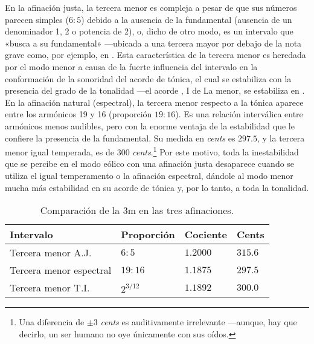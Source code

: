 \documentclass[a4paper,12pt]{article}
\begin{document}
\begin{multicols}{2}
  En la afinación justa, la tercera menor es compleja a pesar de que sus números parecen simples ($6:5$) debido a la ausencia de la fundamental (ausencia de un denominador 1, 2 o potencia de 2), o, dicho de otro modo, es un intervalo que «busca a su fundamental» ---ubicada a una tercera mayor por debajo de la nota grave como, por ejemplo,  en \hbox{.} Esta característica de la tercera menor es heredada por el modo menor a causa de la fuerte influencia del intervalo en la conformación de la sonoridad del acorde de tónica, el cual se estabiliza con la presencia del  grado de la tonalidad ---el acorde , I de La menor, se estabiliza en \hbox{.} En la afinación natural (espectral), la tercera menor respecto a la tónica aparece entre los armónicos 19 y 16 (proporción $19:16$). Es una relación interválica entre armónicos menos audibles, pero con la enorme ventaja de la estabilidad que le confiere la presencia de la fundamental. Su medida en \emph{cents} es $297.5$, y la tercera menor igual temperada, es de $300$ \emph{cents}.\footnote{Una diferencia de $\pm3$ \emph{cents} es auditivamente irrelevante ---aunque, hay que decirlo, un ser humano no oye únicamente con sus oídos.} Por este motivo, toda la inestabilidad que se percibe en el modo eólico con una afinación justa desaparece cuando se utiliza el igual temperamento o la afinación espectral, dándole al modo menor mucha más estabilidad en su acorde de tónica y, por lo tanto, a toda la tonalidad.
\end{multicols}

\begin{table}[ht]
  \centering
  \caption{Comparación de la 3m en las tres afinaciones.}\label{tab:3m}
  \begin{tabular}{@{}llll@{}}
  \toprule
  Intervalo               & Proporción  & Cociente & Cents   \\ \midrule
  Tercera menor A.J.      & $6:5$       & $1.2000$ & $315.6$ \\
  Tercera menor espectral & $19:16$     & $1.1875$ & $297.5$ \\
  Tercera menor T.I.      & $2^{3/12}$  & $1.1892$ & $300.0$ \\ \bottomrule
  \end{tabular}
\end{table}
\end{document}
